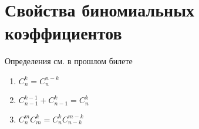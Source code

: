 \documentclass[discrete.tex]{subfiles}
\begin{document}
  \section{Свойства биномиальных коэффициентов}
  
  Определения см. в прошлом билете
  \begin{enumerate}
    \item $C_n^k = C_n^{n-k}$
    \item $C^{k-1}_{n-1} + C^k_{n-1} = C^k_n$
    \item $C^m_n C^k_m = C^k_n C^{m-k}_{n-k}$
  \end{enumerate}
\end{document}
